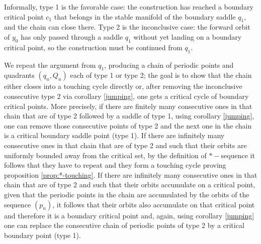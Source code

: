 \documentclass[a4paper,11pt]{article}
\theoremstyle{definition}
\begin{document}
Informally, type 1 is the favorable case: the construction has reached a
 boundary critical point $c_1$ that belongs  in the stable manifold of the
boundary saddle $q_1$, and the chain can close there. Type 2 is the
inconclusive case: the forward orbit of $y_0$ has only passed through a
saddle $q_1$ without yet landing on a boundary critical point, so the
construction must be continued from $q_1$.

We repeat the argument from $q_1$, producing a chain of periodic points and
quadrants $(q_n,Q_n)$ each of type 1 or type 2; the goal is to show that the
chain either closes into a touching cycle directly or, after removing  the
inconclusive consecutive  type 2  via corollary \ref{jumping}, one gets a critical cycle
of boundary critical points. More precisely, if there are finitely many consecutive ones in that chain that are of type 2 followed by a saddle of type 1, using corollary \ref{jumping}, one can remove those consecutive points of type 2 and the next one in the chain is a critical boundary saddle point (type 1).  If there are infinitely many consecutive ones  in that chain  that are of type 2 and such that their orbits are uniformly bounded away from the critical set, by the definition of $*-$sequence it follows that they have to repeat and they form a touching cycle proving proposition \ref{prop:*-touching}.  If there are infinitely many consecutive ones in that chain that are of type 2 and such that their orbits accumulate on a  critical point, given that the periodic points in the chain are accumulated by the orbits of the sequence $(p_n)$, it follows that  their orbits also accumulate on that critical point and therefore it is a boundary critical point and, again, using corollary \ref{jumping} one can replace the consecutive chain of periodic points of type 2 by a critical boundary point (type 1). 
\end{document}
